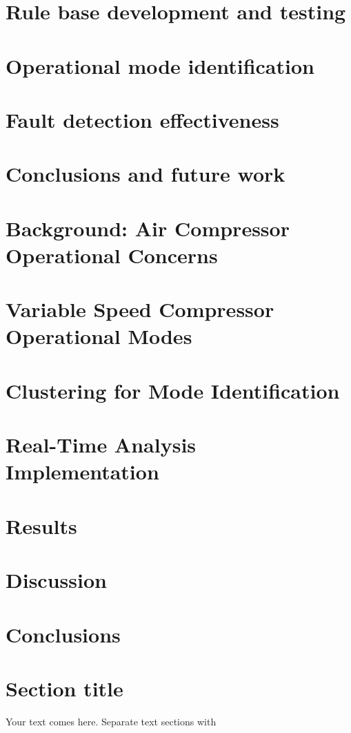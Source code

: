 \section{Rule base development and testing}
\label{sec:rules}

\section{Operational mode identification}
\label{sec:modeidentification}

\section{Fault detection effectiveness}

\section{Conclusions and future work}
\label{sec:conclusions}


\section{Background: Air Compressor Operational Concerns}
\label{sec:1}
\section{Variable Speed Compressor Operational Modes}
\label{sec:2}
\section{Clustering for Mode Identification}
\label{sec:3}
\section{Real-Time Analysis Implementation}
\label{sec:4}
\section{Results}
\label{sec:5}
\section{Discussion}
\label{sec:6}
\section{Conclusions}
\label{sec:7}


\section{Section title}
\label{sec:10}
Your text comes here. Separate text sections with
